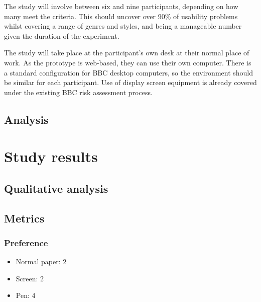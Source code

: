 The study will involve between six and nine participants, depending on how many meet the criteria. This should uncover
over 90\% of usability problems \citep{Nielsen1993} whilst covering a range of genres and styles, and being a
manageable number given the duration of the experiment.

The study will take place at the participant's own desk at their normal place of work. As the prototype is web-based,
they can use their own computer. There is a standard configuration for BBC desktop computers, so the environment should
be similar for each participant. Use of display screen equipment is already covered under the existing BBC risk
assessment process.

\subsection{Analysis}


\section{Study results}\label{sec:paper-results}

\subsection{Qualitative analysis}





\subsection{Metrics}

\subsubsection{Preference}

\begin{itemize}
  \item Normal paper: 2
  \item Screen: 2
  \item Pen: 4
\end{itemize}

